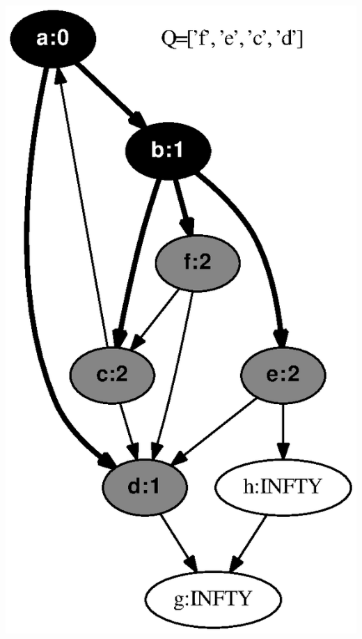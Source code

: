 \documentclass{article}
\begin{document}
\includegraphics[height=.3\textheight]{bfs_directed_classroom_02.eps}
\vspace{1em}
\end{document}
